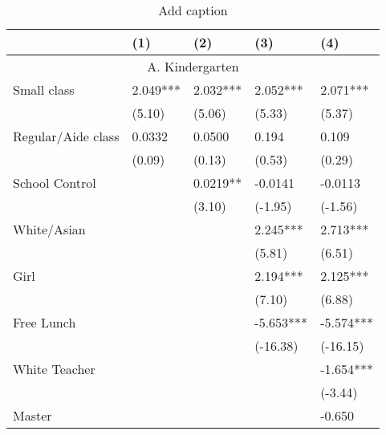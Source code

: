 \documentclass{article}
\begin{document}
\begin{table}[htbp]
  \centering
  \caption{Add caption}
    \begin{tabular}{lrllrr}
    \toprule
          &       & (1)   & (2)   & \multicolumn{1}{l}{(3)} & \multicolumn{1}{l}{(4)} \\
    \midrule
    \multicolumn{6}{c}{A. Kindergarten} \\
    \multicolumn{2}{l}{Small class} & 2.049*** & 2.032*** & \multicolumn{1}{l}{2.052***} & \multicolumn{1}{l}{2.071***} \\
          &       & (5.10) & (5.06) & \multicolumn{1}{l}{(5.33)} & \multicolumn{1}{l}{(5.37)} \\
    \multicolumn{2}{l}{Regular/Aide class} & 0.0332 & 0.0500 & \multicolumn{1}{l}{0.194} & \multicolumn{1}{l}{0.109} \\
          &       & (0.09) & (0.13) & \multicolumn{1}{l}{(0.53)} & \multicolumn{1}{l}{(0.29)} \\
    \multicolumn{2}{l}{School Control} &       & 0.0219** & \multicolumn{1}{l}{-0.0141} & \multicolumn{1}{l}{-0.0113} \\
          &       &       & (3.10) & \multicolumn{1}{l}{(-1.95)} & \multicolumn{1}{l}{(-1.56)} \\
    \multicolumn{2}{l}{White/Asian} &       &       & \multicolumn{1}{l}{2.245***} & \multicolumn{1}{l}{2.713***} \\
          &       &       &       & \multicolumn{1}{l}{(5.81)} & \multicolumn{1}{l}{(6.51)} \\
    \multicolumn{2}{l}{Girl} &       &       & \multicolumn{1}{l}{2.194***} & \multicolumn{1}{l}{2.125***} \\
          &       &       &       & \multicolumn{1}{l}{(7.10)} & \multicolumn{1}{l}{(6.88)} \\
    \multicolumn{2}{l}{Free Lunch} &       &       & \multicolumn{1}{l}{-5.653***} & \multicolumn{1}{l}{-5.574***} \\
          &       &       &       & \multicolumn{1}{l}{(-16.38)} & \multicolumn{1}{l}{(-16.15)} \\
    \multicolumn{2}{l}{White Teacher} &       &       & \multicolumn{1}{l}{} & \multicolumn{1}{l}{-1.654***} \\
          &       &       &       & \multicolumn{1}{l}{} & \multicolumn{1}{l}{(-3.44)} \\
    \multicolumn{2}{l}{Master} &       &       & \multicolumn{1}{l}{} & \multicolumn{1}{l}{-0.650} \\

\end{tabular}
\end{table}
\end{document}
